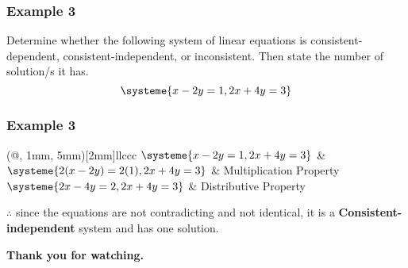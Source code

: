 \documentclass[14pt]{beamer}
\begin{document}
    \begin{frame}
    	\frametitle{Example 3}
    	Determine whether the following system of linear equations is consistent-dependent, consistent-independent, or inconsistent. Then state the number of solution/s it has.
    	\[ \systeme{x - 2y = 1, 2x + 4y = 3} \] 
    \end{frame}
    
    \begin{frame}
    	\frametitle{Example 3}
    	
    	\begin{TAB}(@, 1mm, 5mm)[2mm]{ll}{ccc}
    		$ \systeme{x - 2y = 1, 2x + 4y = 3} $  & \\%
    		
    		\pause $ \systeme{2(x - 2y) = 2(1), 2x + 4y = 3} $  & Multiplication Property \\%
    		
    		\pause $ \systeme{2x - 4y = 2, 2x + 4y = 3} $ &  Distributive Property \\%
    	\end{TAB}
    	
    	$ \therefore $ since the equations are not contradicting and not identical, it is a \textbf{Consistent-independent} system and has one solution.
    \end{frame}
    
    
    \begin{frame}
    	\begin{center}
    		\textbf{\LARGE Thank you for watching.}
    	\end{center}
    \end{frame}
	
\end{document}
